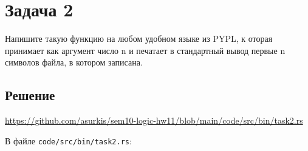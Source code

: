 \section{Задача 2}
Напишите такую функцию на любом удобном языке из PYPL, к
оторая принимает как аргумент число n и печатает в
стандартный вывод первые n символов файла,
в котором записана.

\subsection{Решение}
\url{https://github.com/asurkis/sem10-logic-hw11/blob/main/code/src/bin/task2.rs}

В файле \texttt{code/src/bin/task2.rs}:

\inputminted{rust}{code/src/bin/task2.rs}
